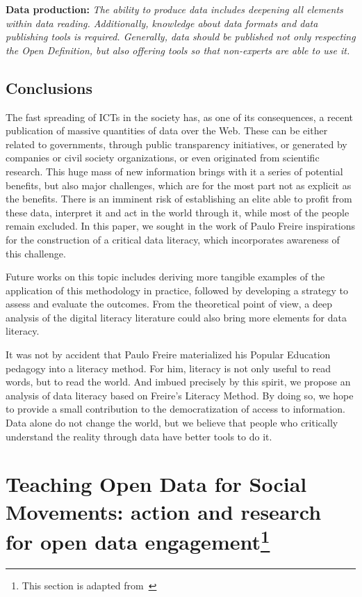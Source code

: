 \noindent \textbf{Data production:} \emph{The ability to produce data includes deepening all elements within data reading. Additionally, knowledge about data formats and data publishing tools is required. Generally, data should be published not only respecting the Open Definition, but also offering tools so that non-experts are able to use it.}



\subsection{Conclusions}

The fast spreading of ICTs in the society has, as one of its consequences, a recent publication of massive quantities of data over the Web. These can be either related to governments, through public transparency initiatives, or generated by companies or civil society organizations, or even originated from scientific research. This huge mass of new information brings with it a series of potential benefits, but also major challenges, which are for the most part not as explicit as the benefits. There is an imminent risk of establishing an elite able to profit from these data, interpret it and act in the world through it, while most of the people remain excluded. In this paper, we sought in the work of Paulo Freire inspirations for the construction of a critical data literacy, which incorporates awareness of this challenge.

Future works on this topic includes deriving more tangible examples of the application of this methodology in practice, followed by developing a strategy to assess and evaluate the outcomes. From the theoretical point of view, a deep analysis of the digital literacy literature could also bring more elements for data literacy. 

It was not by accident that Paulo Freire materialized his Popular Education pedagogy into a literacy method. For him, literacy is not only useful to read words, but to read the world. And imbued precisely by this spirit, we propose an analysis of data literacy based on Freire's Literacy Method. By doing so, we hope to provide a small contribution to the democratization of access to information. Data alone do not change the world, but we believe that people who critically understand the reality through data have better tools to do it.

\section[Teaching Open Data for Social Movements: action and research for open data engagement]{Teaching Open Data for Social Movements: action and research for open data engagement\footnote{This section is adapted from~}}

